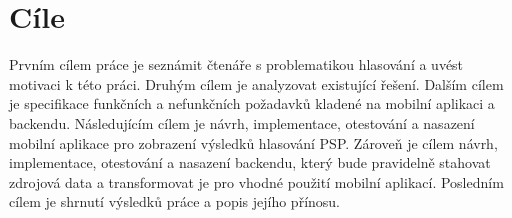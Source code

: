 \chapter*{Cíle}

\setcounter{page}{1}

Prvním cílem práce je seznámit čtenáře s problematikou hlasování a uvést motivaci k této práci. Druhým cílem je analyzovat existující řešení. Dalším cílem je specifikace funkčních a nefunkčních požadavků kladené na mobilní aplikaci a backendu. Následujícím cílem je návrh, implementace, otestování a nasazení mobilní aplikace pro zobrazení výsledků hlasování PSP. Zároveň je cílem návrh, implementace, otestování a nasazení backendu, který bude pravidelně stahovat zdrojová data a transformovat je pro vhodné použití mobilní aplikací. Posledním cílem je shrnutí výsledků práce a popis jejího přínosu.